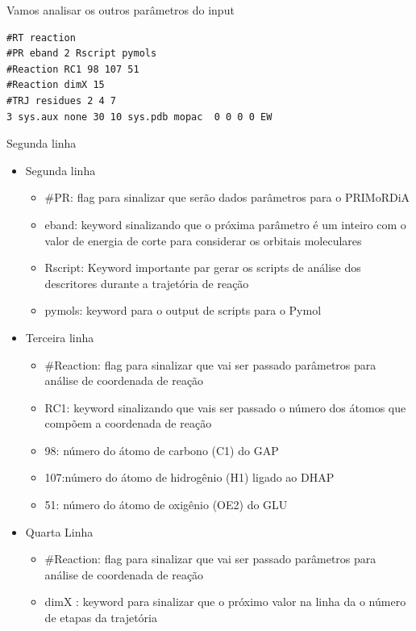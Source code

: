 \documentclass[a4paper,11pt]{refart}
\begin{document}
Vamos analisar os outros parâmetros do input

\hspace*{-\leftmarginwidth}
\begin{minipage}{\fullwidth}
\begin{lstlisting}[caption={Input editado para execução do tutorial 3},label={tut402}]
#RT reaction 
#PR eband 2 Rscript pymols
#Reaction RC1 98 107 51
#Reaction dimX 15
#TRJ residues 2 4 7
3 sys.aux none 30 10 sys.pdb mopac  0 0 0 0 EW
\end{lstlisting}
\end{minipage}

Segunda linha
\begin{itemize}
	\item Segunda linha
	\begin{itemize}
	\item \#PR:     flag para sinalizar que serão dados parâmetros para o PRIMoRDiA
	\item eband:   keyword sinalizando que o próxima parâmetro é um inteiro com o valor de energia de corte para considerar os orbitais moleculares
	\item Rscript: Keyword importante par gerar os scripts de análise dos descritores durante a trajetória de reação
	\item pymols:  keyword para o output de scripts para o Pymol
	\end{itemize}
	\item Terceira linha
	\begin{itemize}
	\item \#Reaction: flag para sinalizar que vai ser passado parâmetros para análise de coordenada de reação
	\item RC1: keyword sinalizando que vais ser passado o número dos átomos que compõem a coordenada de reação
	\item 98: número do átomo de carbono (C1) do GAP 
	\item 107:número do átomo de hidrogênio (H1) ligado ao DHAP
	\item 51: número do átomo de oxigênio (OE2) do GLU
	\end{itemize}
	\item Quarta Linha
	\begin{itemize}
	\item \#Reaction: flag para sinalizar que vai ser passado parâmetros para análise de coordenada de reação
	\item dimX     : keyword para sinalizar que o próximo valor na linha da o número de etapas da trajetória

\end{itemize}
\end{itemize}
\end{document}
